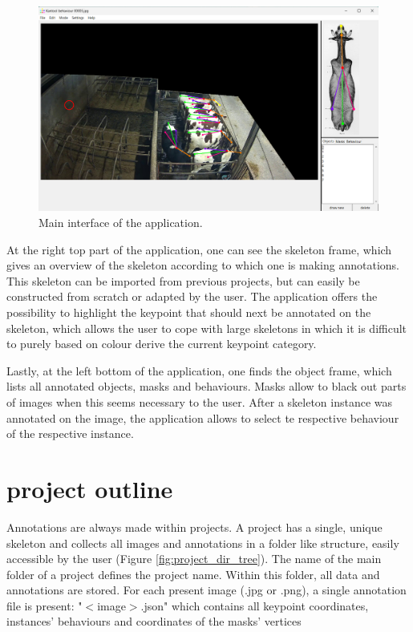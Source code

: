 \documentclass[a4paper, 11pt]{article}
\begin{document}
\begin{figure}[htb]
	\centering
	\includegraphics[width=\textwidth]{application_main_view}
	\captionsetup{width=\textwidth}
	\caption{Main interface of the application.}
	\label{fig:application_main_view}
\end{figure}

At the right top part of the application, one can see the skeleton frame, which gives an overview of the skeleton according to which one is making annotations. This skeleton can be imported from previous projects, but can easily be constructed from scratch or adapted by the user. The application offers the possibility to highlight the keypoint that should next be annotated on the skeleton, which allows the user to cope with large skeletons in which it is difficult to purely based on colour derive the current keypoint category. 

Lastly, at the left bottom of the application, one finds the object frame, which lists all annotated objects, masks and behaviours. Masks allow to black out parts of images when this seems necessary to the user. After a skeleton instance was annotated on the image, the application allows to select te respective behaviour of the respective instance.

\section{project outline}
Annotations are always made within projects. A project has a single, unique skeleton and collects all images and annotations in a folder like structure, easily accessible by the user (Figure \ref{fig:project_dir_tree}). The name of the main folder of a project defines the project name. Within this folder, all data and annotations are stored. For each present image (.jpg or .png), a single annotation file is present: "$<$image$>$.json" which contains all keypoint coordinates, instances' behaviours and coordinates of the masks' vertices
\end{document}
